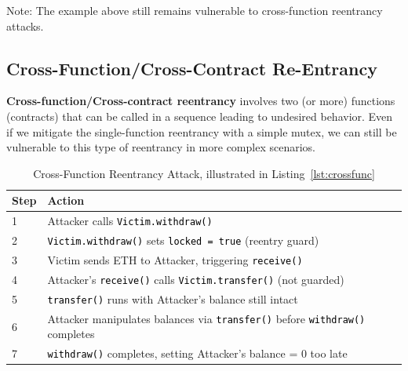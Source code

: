 \documentclass[12pt]{article}
\newcommand{\codegrey}[1]{%
  \texttt{\colorbox{black!4}{\textcolor{black}{#1}}}%
}
\begin{document}
\noindent
Note: The example above still remains vulnerable to cross-function reentrancy attacks.

\subsection{Cross-Function/Cross-Contract Re-Entrancy}

\textbf{Cross-function/Cross-contract reentrancy} involves two (or more) functions (contracts) that can be called in a sequence leading to undesired behavior. Even if we mitigate the single-function reentrancy with a simple mutex, we can still be vulnerable to this type of reentrancy in more complex scenarios.

\begin{table}[H]
    \centering
    \begin{tabular}{p{1.0cm}|p{\dimexpr\textwidth-1cm\relax}}
        \textbf{Step} & \textbf{Action}                                                                                \\
        \hline
        1             & Attacker calls \codegrey{Victim.withdraw()}                                                    \\
        \hline
        2             & \codegrey{Victim.withdraw()} sets \codegrey{locked = true} (reentry guard)                     \\
        \hline
        3             & Victim sends ETH to Attacker, triggering \codegrey{receive()}                                  \\
        \hline
        4             & Attacker's \codegrey{receive()} calls \codegrey{Victim.transfer()} (not guarded)               \\
        \hline
        5             & \codegrey{transfer()} runs with Attacker's balance still intact                                \\
        \hline
        6             & Attacker manipulates balances via \codegrey{transfer()} before \codegrey{withdraw()} completes \\
        \hline
        7             & \codegrey{withdraw()} completes, setting Attacker's balance = 0 too late                       \\
    \end{tabular}
    \caption{Cross-Function Reentrancy Attack, illustrated in Listing~\ref{lst:crossfunc}}
    \label{tab:reentrancy}
\end{table}
\end{document}
